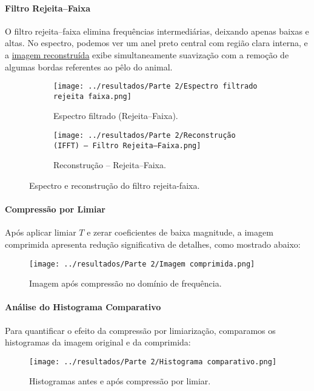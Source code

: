 \documentclass[12pt,a4paper]{article}
\begin{document}
\paragraph{Filtro Rejeita–Faixa}
O filtro rejeita–faixa elimina frequências intermediárias, deixando apenas baixas e altas. No espectro, podemos ver um anel preto central com região clara interna, e a \href{fig:rec_rf}{imagem reconstruída} exibe simultaneamente suavização com a remoção de algumas bordas referentes ao pêlo do animal.

\begin{figure}[H]
  \centering
  \begin{subfigure}[b]{0.45\linewidth}
    \centering
    \texttt{[image: ../resultados/Parte 2/Espectro filtrado rejeita faixa.png]}
    \caption{Espectro filtrado (Rejeita–Faixa).}
    \label{fig:espec_rf}
  \end{subfigure}
  \hfill
  \begin{subfigure}[b]{0.45\linewidth}
    \centering
    \texttt{[image: ../resultados/Parte 2/Reconstrução (IFFT) — Filtro Rejeita–Faixa.png]}
    \caption{Reconstrução – Rejeita–Faixa.}
    \label{fig:rec_rf}
  \end{subfigure}
  \caption{Espectro e reconstrução do filtro rejeita-faixa.}
  \label{fig:rf_comparacao}
\end{figure}

\paragraph{Compressão por Limiar}
Após aplicar limiar \(T\) e zerar coeficientes de baixa magnitude, a imagem comprimida apresenta redução significativa de detalhes, como mostrado abaixo:

\begin{figure}[H]
  \centering
  \texttt{[image: ../resultados/Parte 2/Imagem comprimida.png]}
  \caption{Imagem após compressão no domínio de frequência.}
  \label{fig:img_comp}
\end{figure}

\paragraph{Análise do Histograma Comparativo}

Para quantificar o efeito da compressão por limiarização, comparamos os histogramas da imagem original e da comprimida:

\begin{figure}[H]
  \centering
  \texttt{[image: ../resultados/Parte 2/Histograma comparativo.png]}
  \caption{Histogramas antes e após compressão por limiar.}
  \label{fig:hist_comp}
\end{figure}
\end{document}
